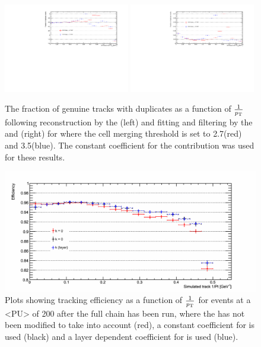 \begin{figure}[tbp]
\centering
\includegraphics[width=0.49\textwidth]{figs/tk-upgrade/results-lowPtTracking/htFracDuplicatesVsInvPtTiltedGeometry_5000.pdf}
\includegraphics[width=0.49\textwidth]{figs/tk-upgrade/results-lowPtTracking/kfFracDuplicatesVsInvPtTiltedGeometry_5000.pdf}
\caption{The fraction of genuine tracks with duplicates as a function of $\frac{1}{p_{\mathrm{T}}}$ following reconstruction by the \HT (left) and fitting and filtering by the \KF and \DR (right) for where the \HT cell merging \pT threshold is set to 2.7\GeV (red) and 3.5\GeV (blue). 
The constant coefficient for the \MS contribution was used for these \KF results.
}
\label{fig:2GeVfracDups}
\end{figure}

\begin{figure}[tbp]
\centering
\includegraphics[width=\textwidth]{figs/tk-upgrade/results-lowPtTracking/kfTrackingEffVsInvPtTiltedGeometry_5000.pdf}
\caption{Plots showing tracking efficiency as a function of $\frac{1}{p_{\mathrm{T}}}$ for \ttbar events at a <PU> of 200 after the full chain has been run, where the \KF has not been modified to take \MS into account (red), a constant coefficient for \MS is used (black) and a layer dependent coefficient for \MS is used (blue).
}
\label{fig:2GeVTiltEff}	
\end{figure}

